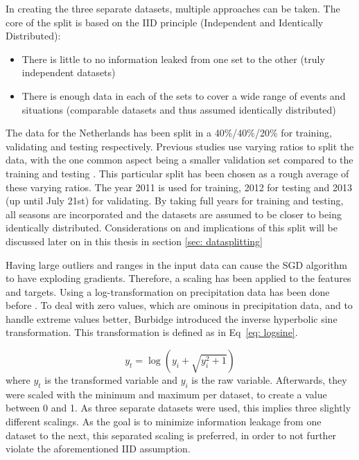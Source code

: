 \documentclass[twocolumn, 10pt, a4paper]{memoir}
\begin{document}
	In creating the three separate datasets, multiple approaches can be taken. The core of the split is based on the IID principle (Independent and Identically Distributed):
	
	\begin{itemize}
		\item There is little to no information leaked from one set to the other (truly independent datasets)
		\item There is enough data in each of the sets to cover a wide range of events and situations (comparable datasets and thus assumed identically distributed)
	\end{itemize}
	The data for the Netherlands has been split in a 40\%/40\%/20\% for training, validating and testing respectively. Previous studies use varying ratios to split the data, with the one common aspect being a smaller validation set compared to the training and testing \cite{Polz2020,Diba2021,Pudashine2020}. This particular split has been chosen as a rough average of these varying ratios.
	The year 2011 is used for training, 2012 for testing and 2013 (up until July 21st) for validating. By taking full years for training and testing, all seasons are incorporated and the datasets are assumed to be closer to being identically distributed. Considerations on and implications of this split will be discussed later on in this thesis in section \ref{sec: datasplitting}
	
	Having large outliers and ranges in the input data can cause the SGD algorithm to have exploding gradients. Therefore, a scaling has been applied to the features and targets. Using a log-transformation on precipitation data has been done before \cite{Kilmartin1972}. To deal with zero values, which are ominous in precipitation data, and to handle extreme values better, Burbidge  introduced the inverse hyperbolic sine transformation. This transformation is defined as in Eq~\ref{eq: logsine}.
	
	\begin{equation}
		\label{eq: logsine}
		y_t = \log(y_i + \sqrt{y_i^2 + 1})
	\end{equation}
	where $y_t$ is the transformed variable and $y_i$ is the raw variable.
	Afterwards, they were scaled with the minimum and maximum per dataset, to create a value between 0 and 1. As three separate datasets were used, this implies three slightly different scalings. As the goal is to minimize information leakage from one dataset to the next, this separated scaling is preferred, in order to not further violate the aforementioned IID assumption.
	
\end{document}
